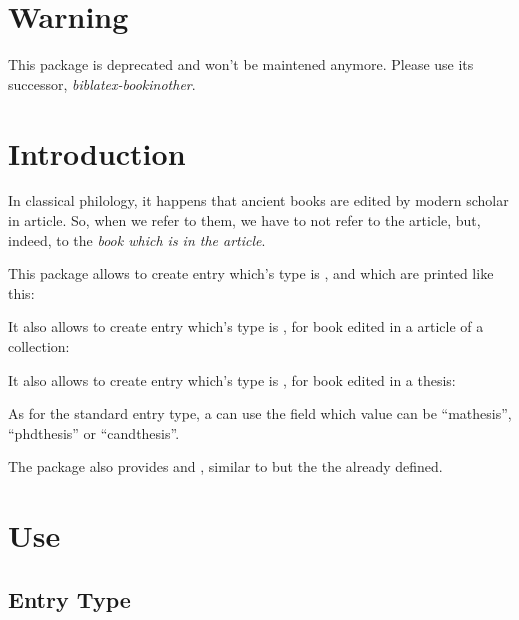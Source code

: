 \documentclass{ltxdockit}[2011/03/25]
\begin{document}
\printtitlepage
\tableofcontents

\section{Warning}

This package is deprecated and won't be maintened anymore.
Please use its successor, \emph{biblatex-bookinother}.

\section{Introduction}

In classical philology, it happens that ancient books are edited by modern scholar in article. So, when we refer to them, we have to not refer to the article, but, indeed, to the \emph{book which is in the article}.

This package allows to create entry which's type is , and which are printed like this:

\begin{quotation}
\cite{BHG226e}
\end{quotation}

It also allows to create entry which's type is , for book edited in a article of a collection:

\begin{quotation}
  \cite{AcTiteLatin}
\end{quotation}

It also allows to create entry which's type is , for book edited in a thesis:

\begin{quotation}
  \cite{inphd:2015}
\end{quotation}

As for the standard  entry type, a  can use the  field which value can be \enquote{mathesis}, \enquote{phdthesis} or \enquote{candthesis}.

The package also provides  and , similar to  but the the  already defined.

\section{Use}

\subsection{ Entry Type}
\end{document}
